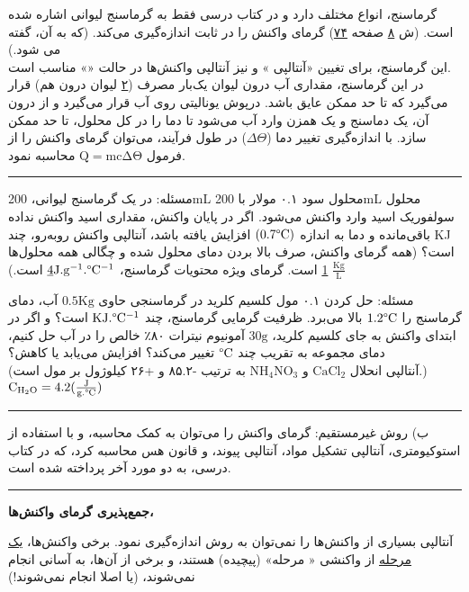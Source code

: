 \documentclass[a4paper,12pt]{article}
\makeatletter
\newcommand{\lin}{\vspace{4pt}\hrule\vspace{4pt}}
\def\extra{\rule{1ex}{0ex}}
\newcommand\censor{\@ifstar{\@cenmath}{\@centext}}
\newcommand\@cenmath[1]{%
	\protect\rule[-.3ex]{\widthofpbox{\extra$#1$}}{0.1ex}}
\newcommand\@centext[1]{%
	\protect\rule[-.3ex]{\widthofpbox{\extra#1}}{0.1ex}}
\makeatother
\begin{document}
گرماسنج، انواع مختلف دارد و در کتاب درسی فقط به گرماسنج لیوانی اشاره شده است. (ش \underline{۸} صفحه \underline{۷۴})
گرمای واکنش را در \censor{فشار} ثابت اندازه‌گیری می‌کند. (که به آن، \censor{$\Delta H$} گفته می شود.)\\
این گرما‌سنج، برای تغیین «آنتالپی \censor{انحلال}» و نیز آنتالپی واکنش‌ها در حالت «\censor{محلول}» مناسب است.\\
در این گرماسنج، مقداری آب درون لیوان یک‌بار مصرف (\underline{۲} لیوان درون هم) قرار می‌گیرد که تا حد ممکن عایق \censor{گرما} باشد. درپوش یونالیتی روی آب قرار می‌گیرد و از درون آن، یک دماسنج و یک همزن وارد آب می‌شود تا دما را در کل محلول، تا حد ممکن \censor{یکسان} سازد. با اندازه‌گیری تغییر دما ($\Delta\Theta$) در طول فرآیند، می‌توان گرمای واکنش را از فرمول
$\mathrm{Q=mc\Delta\Theta}$
محاسبه نمود.
\lin
مسئله: در یک گرماسنج لیوانی، 200mL محلول سود ۰.۱ مولار با 200mL محلول سولفوریک اسید وارد واکنش می‌شود. اگر در پایان واکنش، مقداری اسید واکنش نداده باقی‌مانده و دما به اندازه $\mathrm{(0.7\degree C)}$ افزایش یافته باشد، آنتالپی واکنش روبه‌رو، چند KJ است؟ \quad (همه گرمای واکنش، صرف بالا بردن دمای محلول شده و چگالی همه محلول‌ها
$\mathrm{\frac{Kg}{L}}$
\underline{1}
است. گرمای ویژه محتویات گرماسنج،
$\mathrm{\underline{4}J.g^{-1}.\degree C^{-1}}$
است.)
\begin{flushleft}
\end{flushleft}
\newpage
مسئله: حل کردن ۰.۱ مول کلسیم کلرید در گرما‌سنجی حاوی
$\mathrm{0.5Kg}$
آب، دمای گرماسنج را
$\mathrm{1.2\degree C}$
بالا می‌برد. ظرفیت گرمایی گرما‌سنج، چند
$\mathrm{KJ.\degree C^{-1}}$
است؟ و اگر در ابتدای واکنش به جای کلسیم کلرید، $\mathrm{30g}$ آمونیوم نیترات ۸۰٪ خالص را در آب حل کنیم، دمای مجموعه به تقریب چند
$\mathrm{\degree C}$
تغییر می‌کند؟ افزایش می‌یابد یا کاهش؟\\(آنتالپی انحلال
$\mathrm{CaCl_{2}}$
و
$\mathrm{NH_{4}NO_{3}}$
به ترتیب -۸۵.۲ و +۲۶ کیلوژول بر مول است.)
$\mathrm{C_{H_2O}=4.2(\frac{J}{g.\degree C})}$
\vspace{8em}
\lin
ب) روش غیرمستقیم: گرمای واکنش را می‌توان به کمک محاسبه، و با استفاده از استوکیومتری، آنتالپی تشکیل مواد، آنتالپی پیوند، و قانون هس محاسبه کرد، که در کتاب درسی، به دو مورد آخر پرداخته شده است.
\lin
\begin{center}
	\textbf{جمع‌پذیری گرمای واکنش‌ها، }
\end{center}
آنتالپی بسیاری از واکنش‌ها را نمی‌توان به روش \censor{تجربی} اندازه‌گیری نمود. برخی واکنش‌ها، \underline{یک مرحله} از واکنشی «\censor{چند} مرحله»  (پیچیده) هستند، و برخی از آن‌ها، به آسانی انجام نمی‌شوند، (یا اصلا انجام نمی‌شوند!)\\
\end{document}

